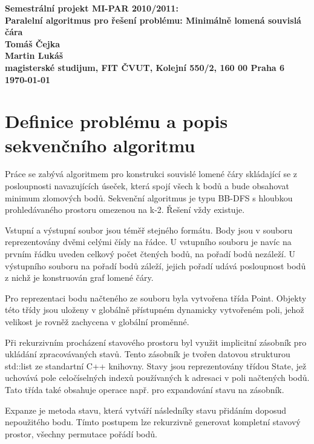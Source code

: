 \documentclass[12pt]{article}
\begin{document}

\begin{center}
\bf Semestrální projekt MI-PAR 2010/2011:\\[5mm]
    Paralelní algoritmus pro řešení problému: Minimálně lomená souvislá čára\\[5mm]
       Tomáš Čejka\\
	   Martin Lukáš\\[2mm]
magisterské studijum, FIT ČVUT, Kolejní 550/2, 160 00 Praha 6\\[2mm]
\today
\end{center}

\section{Definice problému a popis sekvenčního algoritmu}
Práce se zabývá algoritmem pro konstrukci souvislé lomené čáry skládající se z posloupnosti navazujících úseček, která spojí všech k bodů a bude obsahovat minimum zlomových bodů. 
Sekvenční algoritmus je typu BB-DFS s hloubkou prohledávaného prostoru omezenou na k-2. Řešení vždy existuje.

Vstupní a výstupní soubor jsou téměř stejného formátu. Body jsou v souboru reprezentovány dvěmi celými čísly na řádce. U vstupního souboru je navíc na prvním řádku uveden celkový počet čtených bodů, na pořadí bodů nezáleží. U výstupního souboru na pořadí bodů záleží, jejich pořadí udává posloupnost bodů z nichž je konstruován graf lomené čáry.

Pro reprezentaci bodu načteného ze souboru byla vytvořena třída Point. Objekty této třídy jsou uloženy v globálně přístupném dynamicky vytvořeném poli, jehož velikost je rovněž zachycena v globální proměnné.

Při rekurzivním procházení stavového prostoru byl využit implicitní zásobník pro ukládání zpracovávaných stavů. Tento zásobník je tvořen datovou strukturou std::list ze standartní C++ knihovny. Stavy jsou reprezentovány třídou State, jež uchovává pole celočíselných indexů používaných k adresaci v poli načtených bodů. Tato třída také obsahuje operace např. pro expandování stavu na zásobník. 

Expanze je metoda stavu, která vytváří následníky stavu přidáním doposud nepoužitého bodu. Tímto postupem lze rekurzivně generovat kompletní stavový prostor, všechny permutace pořádí bodů. 
\end{document}
